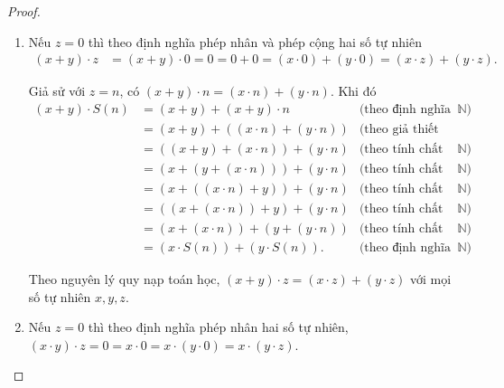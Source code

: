 \begin{proof}
	\begin{enumerate}[label={(\roman*)}]
		\item Nếu $z = 0$ thì theo định nghĩa phép nhân và phép cộng hai số tự nhiên
		      \begin{align*}
			      (x + y)\cdot z & = (x + y)\cdot 0 = 0 = 0 + 0 = (x\cdot 0) + (y\cdot 0) = (x\cdot z) + (y\cdot z).
		      \end{align*}

		      Giả sử với $z = n$, có $(x + y)\cdot n = (x\cdot n) + (y\cdot n)$. Khi đó
		      \begin{align*}
			      (x + y)\cdot S(n) & = (x + y) + (x + y)\cdot n            & \text{(theo định nghĩa phép nhân trên $\mathbb{N}$)}              \\
			                        & = (x + y) + ((x\cdot n) + (y\cdot n)) & \text{(theo giả thiết quy nạp)}                                   \\
			                        & = ((x + y) + (x\cdot n)) + (y\cdot n) & \text{(theo tính chất kết hợp của phép cộng trên $\mathbb{N}$)}   \\
			                        & = (x + (y + (x\cdot n))) + (y\cdot n) & \text{(theo tính chất kết hợp của phép cộng trên $\mathbb{N}$)}   \\
			                        & = (x + ((x\cdot n) + y)) + (y\cdot n) & \text{(theo tính chất giao hoán của phép cộng trên $\mathbb{N}$)} \\
			                        & = ((x + (x\cdot n)) + y) + (y\cdot n) & \text{(theo tính chất kết hợp của phép cộng trên $\mathbb{N}$)}   \\
			                        & = (x + (x\cdot n)) + (y + (y\cdot n)) & \text{(theo tính chất kết hợp của phép cộng trên $\mathbb{N}$)}   \\
			                        & = (x\cdot S(n)) + (y\cdot S(n)).      & \text{(theo định nghĩa của phép nhân trên $\mathbb{N}$)}
		      \end{align*}

		      Theo nguyên lý quy nạp toán học, $(x + y)\cdot z = (x\cdot z) + (y\cdot z)$ với mọi số tự nhiên $x, y, z$.
		\item Nếu $z = 0$ thì theo định nghĩa phép nhân hai số tự nhiên, $(x\cdot y)\cdot z = 0 = x\cdot 0 = x\cdot (y\cdot 0) = x\cdot (y\cdot z)$.


\end{enumerate}
\end{proof}
